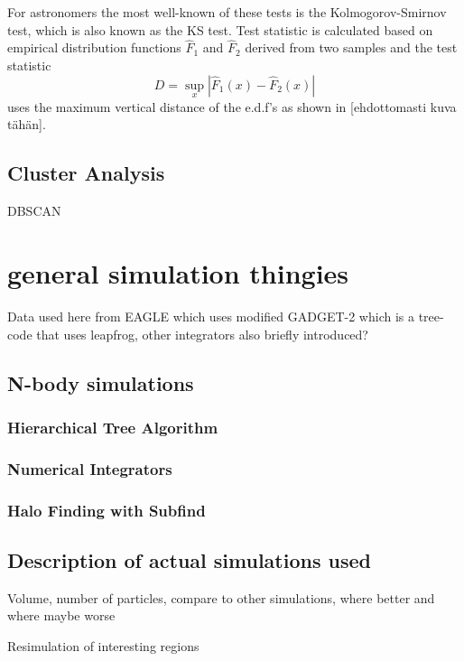 \documentclass[english, oneside]{HYgradu}
\begin{document}
For astronomers the most well-known of these tests is the Kolmogorov-Smirnov test, which is also known as the KS test. Test statistic is calculated based on empirical distribution functions $\hat{F}_1$ and $\hat{F}_2$ derived from two samples and the test statistic
\begin{equation}
	D = \sup_{x} |\hat{F}_1(x) - \hat{F}_2(x)|
\end{equation}
uses the maximum vertical distance of the e.d.f's as shown in [ehdottomasti kuva tähän]. \citep{feigelson2012modern, bohm2010introduction} %




\section{Cluster Analysis}
DBSCAN

\chapter{general simulation thingies}
Data used here from EAGLE which uses modified GADGET-2 which is a tree-code that uses leapfrog, other integrators also briefly introduced?
\section{N-body simulations}
\subsection{Hierarchical Tree Algorithm}
\subsection{Numerical Integrators}
\subsection{Halo Finding with Subfind} %

\section{Description of actual simulations used}
Volume, number of particles, compare to other simulations, where better and where maybe worse

Resimulation of interesting regions
\end{document}
